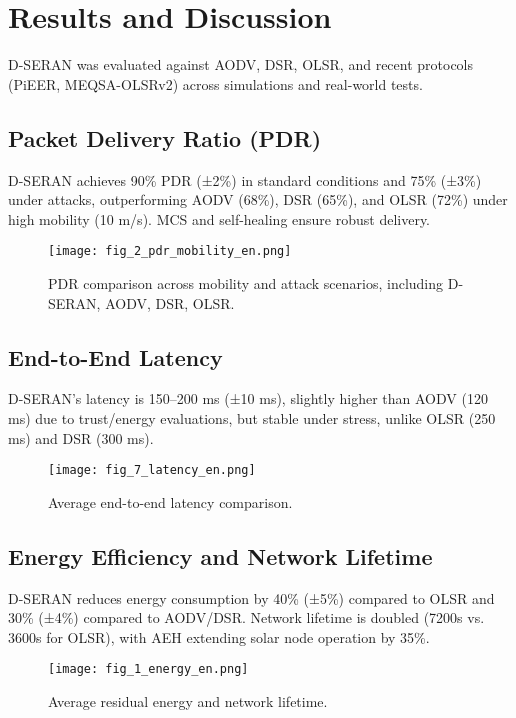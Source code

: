 \documentclass[preprint]{elsarticle}
\begin{document}
\section{Results and Discussion}
\label{sec:results}

D-SERAN was evaluated against AODV, DSR, OLSR, and recent protocols (PiEER, MEQSA-OLSRv2) across simulations and real-world tests.

\subsection{Packet Delivery Ratio (PDR)}
D-SERAN achieves 90\% PDR (±2\%) in standard conditions and 75\% (±3\%) under attacks, outperforming AODV (68\%), DSR (65\%), and OLSR (72\%) under high mobility (10 m/s). MCS and self-healing ensure robust delivery.

\begin{figure}[!t]
    \centering
    \texttt{[image: fig\_2\_pdr\_mobility\_en.png]}
    \caption{PDR comparison across mobility and attack scenarios, including D-SERAN, AODV, DSR, OLSR.}
    \label{fig:pdr}
\end{figure}

\subsection{End-to-End Latency}
D-SERAN’s latency is 150–200 ms (±10 ms), slightly higher than AODV (120 ms) due to trust/energy evaluations, but stable under stress, unlike OLSR (250 ms) and DSR (300 ms).

\begin{figure}[!t]
    \centering
    \texttt{[image: fig\_7\_latency\_en.png]}
    \caption{Average end-to-end latency comparison.}
    \label{fig:latency}
\end{figure}

\subsection{Energy Efficiency and Network Lifetime}
D-SERAN reduces energy consumption by 40\% (±5\%) compared to OLSR and 30\% (±4\%) compared to AODV/DSR. Network lifetime is doubled (7200s vs. 3600s for OLSR), with AEH extending solar node operation by 35\%.

\begin{figure}[!t]
    \centering
    \texttt{[image: fig\_1\_energy\_en.png]}
    \caption{Average residual energy and network lifetime.}
    \label{fig:energy}
\end{figure}
\end{document}
